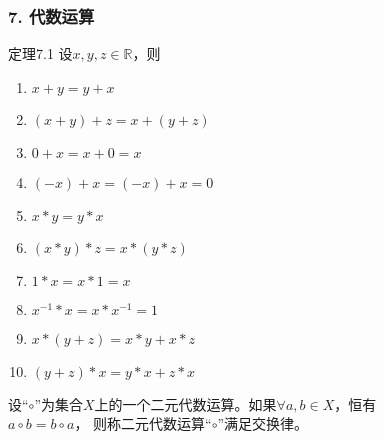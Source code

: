 \documentclass{beamer}
\begin{document}
\begin{CJK*}{UTF8}{gbsn}
\begin{frame}
  \frametitle{7. 代数运算}
  \begin{minipage}[t]{0.49\linewidth}
  \begin{block}{定理7.1}
    设$x, y, z \in \mathbb{R}$，则
   \begin{enumerate}
   \item   $x + y = y + x$
   \item   $(x + y) + z = x + (y + z)$
   \item   $0 + x = x + 0 = x$
   \item   $(-x) + x = (-x) + x = 0$
   \item   $x * y = y * x$
   \item   $(x * y) * z = x * (y *z)$
   \item   $1 * x = x * 1 = x$
   \item   $x^{-1} * x = x * x^{-1} = 1$
   \item   $x* (y + z) = x * y + x * z$
   \item   $(y + z) * x = y * x + z * x$
    \end{enumerate}
  \end{block}\pause
\end{minipage}
\begin{minipage}[t]{0.49\linewidth}
  \begin{Def}
    设“$\circ$”为集合$X$上的一个二元代数运算。如果$\forall a, b \in X$，恒有\\$a \circ b = b \circ a$， 则称二元代数运算“$\circ$”满足\alert{交换律}。
  \end{Def}
\end{minipage}
\end{frame}


\end{CJK*}
\end{document}
